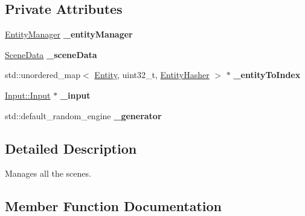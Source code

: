 \subsection*{Private Attributes}
\begin{DoxyCompactItemize}
\item 
\hyperlink{class_ensum_1_1_components_1_1_entity_manager}{Entity\+Manager} {\bfseries \+\_\+entity\+Manager}\hypertarget{class_ensum_1_1_components_1_1_scene_manager_aa4f54931996a70ad663bbcfc3a4f7024}{}\label{class_ensum_1_1_components_1_1_scene_manager_aa4f54931996a70ad663bbcfc3a4f7024}

\item 
\hyperlink{struct_ensum_1_1_components_1_1_scene_manager_1_1_scene_data}{Scene\+Data} {\bfseries \+\_\+scene\+Data}\hypertarget{class_ensum_1_1_components_1_1_scene_manager_a8b83f00b84c55e4bae12d95a588671aa}{}\label{class_ensum_1_1_components_1_1_scene_manager_a8b83f00b84c55e4bae12d95a588671aa}

\item 
std\+::unordered\+\_\+map$<$ \hyperlink{struct_ensum_1_1_components_1_1_entity}{Entity}, uint32\+\_\+t, \hyperlink{struct_ensum_1_1_components_1_1_entity_hasher}{Entity\+Hasher} $>$ $\ast$ {\bfseries \+\_\+entity\+To\+Index}\hypertarget{class_ensum_1_1_components_1_1_scene_manager_afe20076d039658cc2f4cad3c22b644bc}{}\label{class_ensum_1_1_components_1_1_scene_manager_afe20076d039658cc2f4cad3c22b644bc}

\item 
\hyperlink{class_ensum_1_1_input_1_1_input}{Input\+::\+Input} $\ast$ {\bfseries \+\_\+input}\hypertarget{class_ensum_1_1_components_1_1_scene_manager_a997e4d367f66c9f80d27e027999f6802}{}\label{class_ensum_1_1_components_1_1_scene_manager_a997e4d367f66c9f80d27e027999f6802}

\item 
std\+::default\+\_\+random\+\_\+engine {\bfseries \+\_\+generator}\hypertarget{class_ensum_1_1_components_1_1_scene_manager_a60425dc8e0af4eab0fb80a1641626779}{}\label{class_ensum_1_1_components_1_1_scene_manager_a60425dc8e0af4eab0fb80a1641626779}

\end{DoxyCompactItemize}


\subsection{Detailed Description}
Manages all the scenes. 

\subsection{Member Function Documentation}
